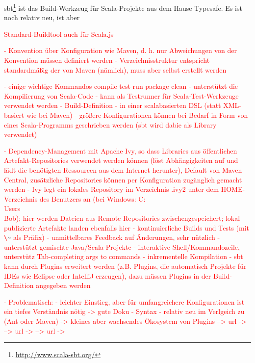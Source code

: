 \documentclass[a4paper, 12pt, hidelinks, listof=totoc, listoftables=totoc, bibliography=totoc]{scrreprt}
\newcommand{\code}[1]{\lstinline[language=Scala, style=inline]|#1|}
\newcommand{\TODO}[1]{\textcolor{red}{#1}\newline}
\begin{document}
sbt\footnote{\url{http://www.scala-sbt.org/}} ist das Build-Werkzeug für Scala-Projekte aus dem Hause Typesafe. Es ist noch relativ neu, ist aber 

\TODO{Standard-Buildtool auch für Scala.js}

\TODO{- Konvention über Konfiguration wie Maven, d. h. nur Abweichungen von der Konvention müssen definiert werden}
\TODO{- Verzeichnisstruktur entspricht standardmäßig der von Maven (nämlich), muss aber selbst erstellt werden}

\TODO{- einige wichtige Kommandos}
\TODO{  compile
  test
  run
  package
  clean
}
\TODO{- unterstützt die Kompilierung von Scala-Code}
\TODO{- kann als Testrunner für Scala-Test-Werkzeuge verwendet werden}
\TODO{- Build-Definition}
\TODO{  - in einer scalabasierten DSL (statt XML-basiert wie bei Maven)}
\TODO{  - größere Konfigurationen können bei Bedarf in Form von eines Scala-Programms geschrieben werden (sbt wird dabie als Library verwendet)}

\TODO{- Dependency-Management mit Apache Ivy, so dass Libraries aus öffentlichen Artefakt-Repositories verwendet werden können (löst Abhängigkeiten auf und lädt die benötigten Ressourcen aus dem Internet herunter), Default von Maven Central, zusätzliche Repositories können per Konfiguration zugänglich gemacht werden}
\TODO{  - Ivy legt ein lokales Repository im Verzeichnis .ivy2 unter dem HOME-Verzeichnis des Benutzers an (bei Windows: C:\\Users\\Bob); hier werden Dateien aus Remote Repositories zwischengespeichert; lokal publizierte Artefakte landen ebenfalls hier}
\TODO{- kontinuierliche Builds und Tests (mit \code{\~} als Präfix) - unmittelbares Feedback auf Änderungen, sehr nützlich}
\TODO{- unterstützt gemischte Java/Scala-Projekte}
\TODO{- interaktive Shell/Kommandozeile, unterstütz Tab-completing args to commands}
\TODO{- inkrementelle Kompilation}
\TODO{- sbt kann durch Plugins erweitert werden (z.B. Plugins, die automatisch Projekte für IDEs wie Eclipse oder IntelliJ erzeugen), dazu müssen Plugins in der Build-Definition angegeben werden}

\TODO{- Problematisch:}
\TODO{  - leichter Einstieg, aber für umfangreichere Konfigurationen ist ein tiefes Verständnis nötig -> gute Doku}
\TODO{  - Syntax}
\TODO{  - relativ neu im Verlgeich zu (Ant oder Maven) -> kleines aber wachsendes Ökosystem von Plugins}
\TODO{-->  url -> %
}
\TODO{-->  url -> %
}
\TODO{-->  url -> %
}
\end{document}
